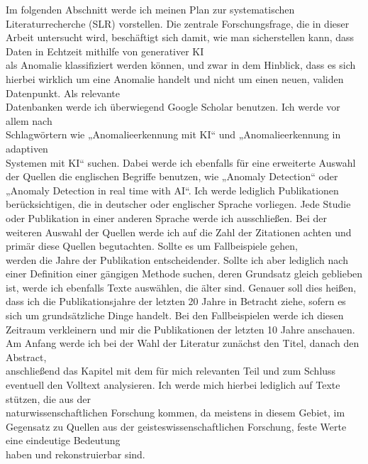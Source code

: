 Im folgenden Abschnitt werde ich meinen Plan zur systematischen Literaturrecherche (SLR) vorstellen. Die zentrale Forschungsfrage, die in dieser Arbeit untersucht wird, beschäftigt sich damit, wie man sicherstellen kann, dass Daten in Echtzeit mithilfe von generativer KI \\ als Anomalie klassifiziert werden können, und zwar in dem Hinblick, dass es sich hierbei wirklich um eine Anomalie handelt und nicht um einen neuen, validen Datenpunkt. Als relevante \\ Datenbanken werde ich überwiegend Google Scholar benutzen. Ich werde vor allem nach \\ Schlagwörtern wie „Anomalieerkennung mit KI“ und „Anomalieerkennung in  adaptiven \\ Systemen mit KI“ suchen. Dabei werde ich ebenfalls für eine erweiterte Auswahl der Quellen die englischen Begriffe benutzen, wie „Anomaly Detection“ oder \\ „Anomaly Detection in real time with AI“. Ich werde lediglich Publikationen berücksichtigen, die in deutscher oder englischer Sprache vorliegen. Jede Studie oder Publikation in einer anderen Sprache werde ich ausschließen. Bei der weiteren Auswahl der Quellen werde ich auf die Zahl der Zitationen achten und primär diese Quellen begutachten. Sollte es um Fallbeispiele gehen,\\ werden die Jahre der Publikation entscheidender. Sollte ich aber lediglich nach einer Definition einer gängigen Methode suchen, deren Grundsatz gleich geblieben ist, werde ich ebenfalls Texte auswählen, die älter sind. Genauer soll dies heißen, dass ich die Publikationsjahre der letzten 20 Jahre in Betracht ziehe, sofern es sich um grundsätzliche Dinge handelt. Bei den Fallbeispielen werde ich diesen Zeitraum verkleinern und mir die Publikationen der letzten 10 Jahre anschauen. Am Anfang werde ich bei der Wahl der Literatur zunächst den Titel, danach den Abstract,\\ anschließend das Kapitel mit dem für mich relevanten Teil und zum Schluss eventuell den Volltext analysieren. Ich werde mich hierbei lediglich auf Texte stützen, die aus der \\ naturwissenschaftlichen Forschung kommen, da meistens in diesem Gebiet, im Gegensatz zu Quellen aus der geisteswissenschaftlichen Forschung, feste Werte eine eindeutige Bedeutung\\ haben und rekonstruierbar sind. 
